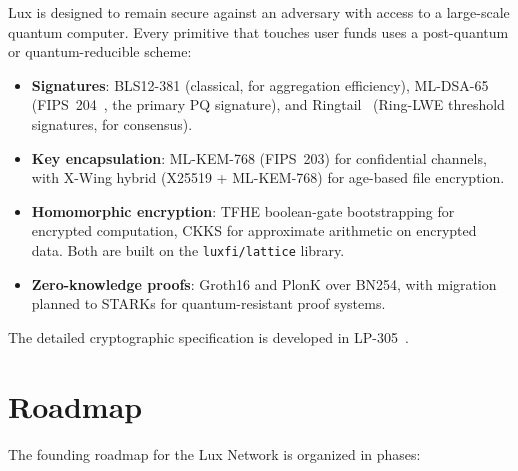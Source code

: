 \documentclass[11pt,a4paper]{article}
\begin{document}
Lux is designed to remain secure against an adversary with access to
a large-scale quantum computer. Every primitive that touches user
funds uses a post-quantum or quantum-reducible scheme:

\begin{itemize}[nosep]
  \item \textbf{Signatures}: BLS12-381 (classical, for aggregation
        efficiency), ML-DSA-65 (FIPS~204~\cite{mldsa}, the primary
        PQ signature), and Ringtail~\cite{ringtail} (Ring-LWE
        threshold signatures, for consensus).
  \item \textbf{Key encapsulation}: ML-KEM-768 (FIPS~203) for
        confidential channels, with X-Wing hybrid (X25519 +
        ML-KEM-768) for age-based file encryption.
  \item \textbf{Homomorphic encryption}: TFHE boolean-gate bootstrapping
        for encrypted computation, CKKS for approximate arithmetic on
        encrypted data. Both are built on the \texttt{luxfi/lattice}
        library.
  \item \textbf{Zero-knowledge proofs}: Groth16 and PlonK over
        BN254, with migration planned to STARKs for quantum-resistant
        proof systems.
\end{itemize}

The detailed cryptographic specification is developed in
LP-305~\cite{lp-305}.

\section{Roadmap}

The founding roadmap for the Lux Network is organized in phases:
\end{document}
